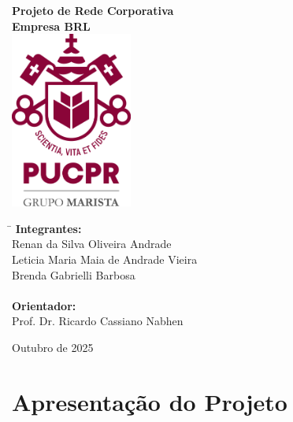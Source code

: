 \documentclass[a4paper, 12pt]{article}
\begin{document}
\begin{titlepage}
    \begin{center}
        \vspace*{1cm}
        {\Large{\textbf{Projeto de Rede Corporativa}}}\\
        \vspace{0.8cm}
        {\large{\textbf{Empresa BRL}}}\\
        \vspace{1.2cm}
        \includegraphics[width=0.3\textwidth]{pucpr.png}
        \vspace{1.2cm}
        
        \begin{flushleft}
            \begin{tabbing}
                \hspace{3cm} \= \kill
                \textbf{Integrantes:} \\
                \> Renan da Silva Oliveira Andrade \\
                \> Leticia Maria Maia de Andrade Vieira \\
                \> Brenda Gabrielli Barbosa \\
                \\
                \textbf{Orientador:} \\
                \> Prof. Dr. Ricardo Cassiano Nabhen \\
            \end{tabbing}
        \end{flushleft}
        \vspace{\fill}
        \large{Outubro de 2025}
    \end{center}
\end{titlepage}

\tableofcontents
\thispagestyle{empty}
\newpage


\section{Apresentação do Projeto}
\label{sec:apresentacao}
\end{document}
